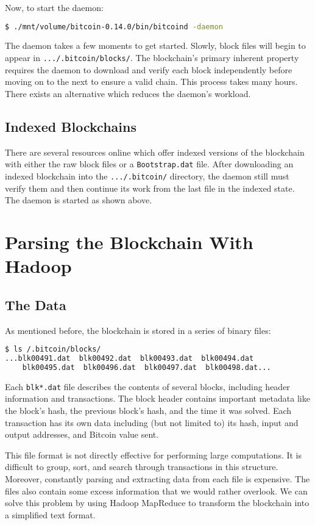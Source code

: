 \documentclass[9pt,twocolumn,twoside]{idsi}
\begin{document}
Now, to start the daemon:
\begin{lstlisting}[language=bash]
 $ ./mnt/volume/bitcoin-0.14.0/bin/bitcoind -daemon
\end{lstlisting}

The daemon takes a few moments to get started. Slowly, block files will begin to appear in \lstinline{.../.bitcoin/blocks/}.  The blockchain's primary inherent property requires the daemon to download and verify each block independently before moving on to the next to ensure a valid chain. This process takes many hours. There exists an alternative which reduces the daemon's workload.

\subsection{Indexed Blockchains}
There are several resources online which offer indexed versions of the blockchain with either the raw block files or a \lstinline{Bootstrap.dat} file. After downloading an indexed blockchain into the \lstinline{.../.bitcoin/} directory, the daemon still must verify them and then continue its work from the last file in the indexed state. The daemon is started as shown above.

\section{Parsing the Blockchain With Hadoop}
\subsection{The Data}
As mentioned before, the blockchain is stored in a series of binary files:
\begin{lstlisting}[language=bash]
 $ ls /.bitcoin/blocks/
...blk00491.dat  blk00492.dat  blk00493.dat  blk00494.dat
    blk00495.dat  blk00496.dat  blk00497.dat  blk00498.dat...
\end{lstlisting}

Each \lstinline{blk*.dat} file describes the contents of several blocks, including header information and transactions. The block header contains important metadata like the block's hash, the previous block's hash, and the time it was solved. Each transaction has its own data including (but not limited to) its hash, input and output addresses, and Bitcoin value sent.

This file format is not directly effective for performing large computations. It is difficult to group, sort, and search through transactions in this structure. Moreover, constantly parsing and extracting data from each file is expensive. The files also contain some excess information that we would rather overlook. We can solve this problem by using Hadoop MapReduce to transform the blockchain into a simplified text format.
\end{document}
